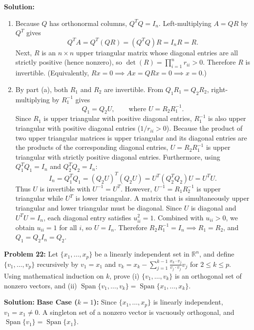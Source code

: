 \documentclass[11pt, letterpaper]{article}
\theoremstyle{definition}
\theoremstyle{remark}
\begin{document}
\textbf{Solution:}
\begin{enumerate}[label=(\alph*)]
    \item Because $Q$ has orthonormal columns, $Q^T Q = I_n$. Left-multiplying $A = QR$ by $Q^T$ gives
    \[
        Q^T A = Q^T (QR) = (Q^T Q) R = I_n R = R.
    \]
    Next, $R$ is an $n \times n$ upper triangular matrix whose diagonal entries are all strictly positive (hence nonzero), so $\det(R) = \prod_{i=1}^n r_{ii} > 0$. Therefore $R$ is invertible. (Equivalently, $Rx = 0 \implies Ax = QRx = 0 \implies x = 0$.)
    \item By part (a), both $R_1$ and $R_2$ are invertible. From $Q_1 R_1 = Q_2 R_2$, right-multiplying by $R_1^{-1}$ gives
    \[
        Q_1 = Q_2 U, \qquad \text{where } U = R_2 R_1^{-1}.
    \]
    Since $R_1$ is upper triangular with positive diagonal entries, $R_1^{-1}$ is also upper triangular with positive diagonal entries ($1/r_{ii} > 0$). Because the product of two upper triangular matrices is upper triangular and its diagonal entries are the products of the corresponding diagonal entries, $U = R_2 R_1^{-1}$ is upper triangular with strictly positive diagonal entries. Furthermore, using $Q_1^T Q_1 = I_n$ and $Q_2^T Q_2 = I_n$:
    \[
        I_n = Q_1^T Q_1 = (Q_2 U)^T (Q_2 U) = U^T (Q_2^T Q_2) U = U^T U.
    \]
    Thus $U$ is invertible with $U^{-1} = U^T$. However, $U^{-1} = R_1 R_2^{-1}$ is upper triangular while $U^T$ is lower triangular. A matrix that is simultaneously upper triangular and lower triangular must be diagonal. Since $U$ is diagonal and $U^T U = I_n$, each diagonal entry satisfies $u_{ii}^2 = 1$. Combined with $u_{ii} > 0$, we obtain $u_{ii} = 1$ for all $i$, so $U = I_n$. Therefore $R_2 R_1^{-1} = I_n \implies R_1 = R_2$, and $Q_1 = Q_2 I_n = Q_2$.
\end{enumerate}

\vspace{0.8em}

\textbf{Problem 22:} Let $\{x_1, \dots, x_p\}$ be a linearly independent set in $\mathbb{R}^n$, and define $\{v_1, \dots, v_p\}$ recursively by $v_1 = x_1$ and $v_k = x_k - \sum_{j=1}^{k-1} \frac{x_k \cdot v_j}{v_j \cdot v_j} v_j$ for $2 \le k \le p$. Using mathematical induction on $k$, prove (i) $\{v_1, \dots, v_k\}$ is an orthogonal set of nonzero vectors, and (ii) $\operatorname{Span}\{v_1, \dots, v_k\} = \operatorname{Span}\{x_1, \dots, x_k\}$.

\textbf{Solution:}
\textbf{Base Case ($k = 1$):} Since $\{x_1, \dots, x_p\}$ is linearly independent, $v_1 = x_1 \neq 0$. A singleton set of a nonzero vector is vacuously orthogonal, and $\operatorname{Span}\{v_1\} = \operatorname{Span}\{x_1\}$.
\end{document}
